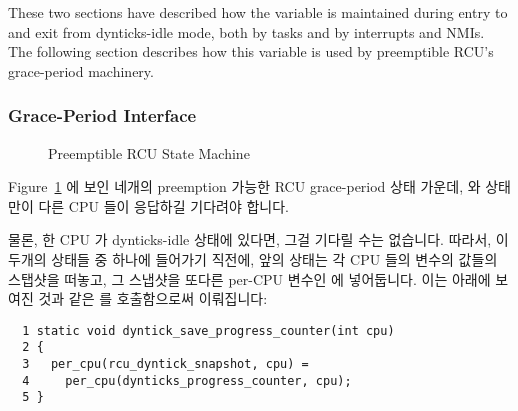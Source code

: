 These two sections have described how the
 variable is maintained during
entry to and exit from dynticks-idle mode, both by tasks and by
interrupts and NMIs.
The following section describes how this variable is used by
preemptible RCU's grace-period machinery.
\fi

\subsubsection{Grace-Period Interface}
\label{sec:formal:Grace-Period Interface}

\begin{figure}[htb]
\centering
{}
\caption{Preemptible RCU State Machine}
\label{fig:formal:Preemptible RCU State Machine}
\end{figure}

Figure~\ref{fig:formal:Preemptible RCU State Machine} 에 보인 네개의 preemption
가능한 RCU grace-period 상태 가운데,  와
 상태만이 다른 CPU 들이 응답하길 기다려야
합니다.

물론, 한 CPU 가 dynticks-idle 상태에 있다면, 그걸 기다릴 수는 없습니다.
따라서, 이 두개의 상태들 중 하나에 들어가기 직전에, 앞의 상태는 각 CPU 들의
 변수의 값들의 스탭샷을 떠놓고, 그 스냅샷을
또다른 per-CPU 변수인  에 넣어둡니다.
이는 아래에 보여진 것과 같은  를
호출함으로써 이뤄집니다:
\iffalse

Of the four preemptible RCU grace-period states shown in
Figure~\ref{fig:formal:Preemptible RCU State Machine},
only the \co{rcu_try_flip_waitack_state()}
and \co{rcu_try_flip_waitmb_state()} states need to wait
for other CPUs to respond.

Of course, if a given CPU is in dynticks-idle state, we shouldn't
wait for it.
Therefore, just before entering one of these two states,
the preceding state takes a snapshot of each CPU's
\co{dynticks_progress_counter} variable, placing the
snapshot in another per-CPU variable,
\co{rcu_dyntick_snapshot}.
This is accomplished by invoking
\co{dyntick_save_progress_counter()}, shown below:
\fi

{ \scriptsize
\begin{verbatim}
  1 static void dyntick_save_progress_counter(int cpu)
  2 {
  3   per_cpu(rcu_dyntick_snapshot, cpu) =
  4     per_cpu(dynticks_progress_counter, cpu);
  5 }
\end{verbatim}
}

